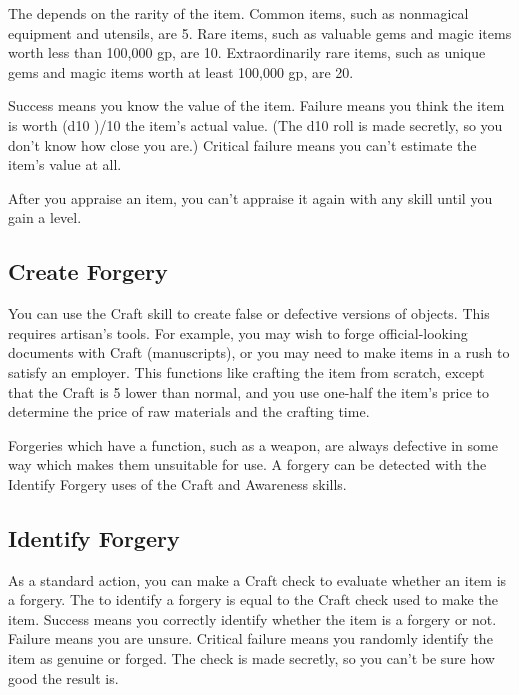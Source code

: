         The  depends on the rarity of the item. Common items, such as nonmagical equipment and utensils, are  5. Rare items, such as valuable gems and magic items worth less than 100,000 gp, are  10. Extraordinarily rare items, such as unique gems and magic items worth at least 100,000 gp, are  20.

        Success means you know the value of the item. Failure means you think the item is worth (d10 )/10 \x the item's actual value. (The d10 roll is made secretly, so you don't know how close you are.) Critical failure means you can't estimate the item's value at all.

        After you appraise an item, you can't appraise it again with any skill until you gain a level.

    \subsection{Create Forgery}
        You can use the Craft skill to create false or defective versions of objects.
        This requires artisan's tools.
        For example, you may wish to forge official-looking documents with Craft (manuscripts), or you may need to make items in a rush to satisfy an employer. This functions like crafting the item from scratch, except that the Craft  is 5 lower than normal, and you use one-half the item's price to determine the price of raw materials and the crafting time.

        Forgeries which have a function, such as a weapon, are always defective in some way which makes them unsuitable for use. A forgery can be detected with the Identify Forgery uses of the Craft and Awareness skills.

    \subsection{Identify Forgery}
        As a standard action, you can make a Craft check to evaluate whether an item is a forgery. The  to identify a forgery is equal to the Craft check used to make the item. Success means you correctly identify whether the item is a forgery or not. Failure means you are unsure. Critical failure means you randomly identify the item as genuine or forged. The check is made secretly, so you can't be sure how good the result is.

